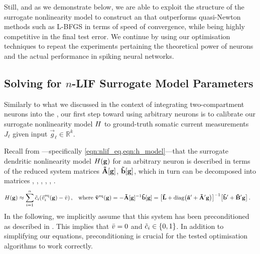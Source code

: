 Still, and as we demonstrate below, we are able to exploit the structure of the surrogate nonlinearity model \Hden to construct an \SQP that outperforms quasi-Newton methods such as L-BFGS in terms of speed of convergence, while being highly competitive in the final test error.
We continue by using our optimisation techniques to repeat the experiments pertaining the theoretical power of \nlif neurons and the actual performance in spiking neural networks.

\subsection{Solving for $n$-LIF Surrogate Model Parameters}
\label{sec:nlif_opt_parameters}

Similarly to what we discussed in the context of integrating two-compartment neurons into the \NEF, our first step toward using arbitrary \nlif neurons is to calibrate our surrogate nonlinearity model ${H}$ to ground-truth somatic current measurements $J_\ell$ given input $\vec g_\ell \in \mathbb{R}^k$.

Recall from ---specifically \cref{eqn:nlif_eq,eqn:h_model}---that the surrogate dendritic nonlinearity model ${H}(\mathbf{g})$ for an arbitrary \nlif neuron is described in terms of the reduced system matrices $\mathbf{\tilde A}[\mathbf{g}]$, $\mathbf{\tilde b}[\mathbf{g}]$, which in turn can be decomposed into matrices \mrL, \vrap, \mrAp, \vrbp, \mrBp, \vrc.
\begin{align*}
	{\ensuremath{H}}(\mathbf{g})
		&\approx \sum_{i = 1}^n {\tilde c}_i ({\tilde v}_i^\mathrm{eq}(\mathbf{g}) - {{\bar v}}) \,,
		& \text{where } \mathbf{\tilde v}^\mathrm{eq}(\mathbf{g})
			&= -{\mathbf{\tilde A}}[\mathbf{g}]^{-1} \mathbf{\tilde b}[\mathbf{g}]
			 = \bigl[\mathbf{\tilde L} + \operatorname{\mathrm{diag}}\bigl(\mathbf{\tilde a}' + \mathbf{\tilde A}' \mathbf{g}\bigr) \bigr]^{-1} \bigl[ \mathbf{\tilde b}' + \mathbf{\tilde B}' \mathbf{g} \bigr] \,.
\end{align*}
In the following, we implicitly assume that this system has been preconditioned as described in .
This implies that ${{\bar v}} = 0$ and ${\tilde c}_i \in \{0, 1\}$.
In addition to simplifying our equations, preconditioning is crucial for the tested optimisation algorithms to work correctly.

